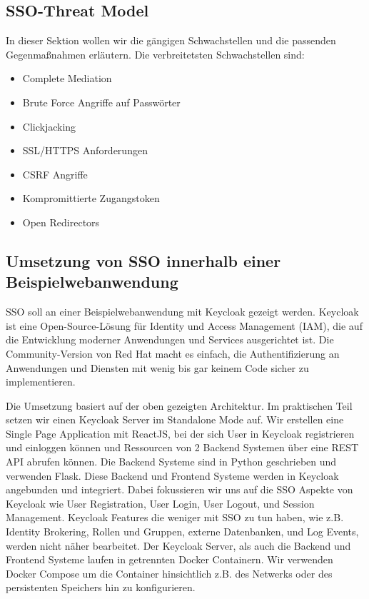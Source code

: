 \documentclass[12pt]{article}
\begin{document}
\subsection{SSO-Threat Model}
	
In dieser Sektion wollen wir die gängigen Schwachstellen und die passenden Gegenmaßnahmen erläutern.
Die verbreitetsten Schwachstellen sind:
	
\begin{itemize}
	\item Complete Mediation
		
	\item Brute Force Angriffe auf Passwörter
		
	\item Clickjacking
	
		
	\item SSL/HTTPS Anforderungen
	
	\item CSRF Angriffe
	
	\item Kompromittierte Zugangstoken
	
	\item Open Redirectors
\end{itemize}

\subsection{Umsetzung von SSO innerhalb einer Beispielwebanwendung}
SSO soll an einer Beispielwebanwendung mit Keycloak gezeigt werden. Keycloak ist eine Open-Source-Lösung für Identity und Access Management (IAM), die auf die Entwicklung moderner Anwendungen und Services ausgerichtet ist. Die Community-Version von Red Hat macht es einfach, die Authentifizierung an Anwendungen und Diensten mit wenig bis gar keinem Code sicher zu implementieren. \cite{RFC6819}

Die Umsetzung basiert auf der oben gezeigten Architektur. Im praktischen Teil setzen wir einen Keycloak Server im Standalone Mode auf. Wir erstellen eine Single Page Application mit ReactJS, bei der sich User in Keycloak registrieren und einloggen können und Ressourcen von 2 Backend Systemen über eine REST API abrufen können. Die Backend Systeme sind in Python geschrieben und verwenden Flask. Diese Backend und Frontend Systeme werden in Keycloak angebunden und integriert. Dabei fokussieren wir uns auf die SSO Aspekte von Keycloak wie User Registration, User Login, User Logout, und Session Management. Keycloak Features die weniger mit SSO zu tun haben, wie z.B. Identity Brokering, Rollen und Gruppen, externe Datenbanken, und Log Events, werden nicht näher bearbeitet. Der Keycloak Server, als auch die Backend und Frontend Systeme laufen in getrennten Docker Containern. Wir verwenden Docker Compose um die Container hinsichtlich z.B. des Netwerks oder des persistenten Speichers hin zu konfigurieren.
	
\end{document}
